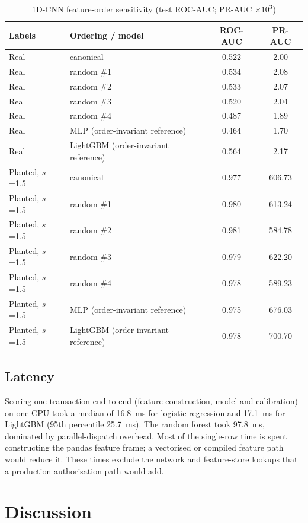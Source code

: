 \documentclass[conference]{IEEEtran}
\begin{document}
\begin{table}[t]
\centering
\caption{1D-CNN feature-order sensitivity (test ROC-AUC; PR-AUC $\times10^3$)}\label{tab:cnn}
\footnotesize
\setlength{\tabcolsep}{3pt}
\begin{tabular}{@{}llcc@{}}
\toprule
Labels & Ordering / model & ROC-AUC & PR-AUC \\
\midrule
Real & canonical & 0.522 & 2.00 \\
Real & random \#1 & 0.534 & 2.08 \\
Real & random \#2 & 0.533 & 2.07 \\
Real & random \#3 & 0.520 & 2.04 \\
Real & random \#4 & 0.487 & 1.89 \\
Real & MLP (order-invariant reference) & 0.464 & 1.70 \\
Real & LightGBM (order-invariant reference) & 0.564 & 2.17 \\
Planted, $s$=1.5 & canonical & 0.977 & 606.73 \\
Planted, $s$=1.5 & random \#1 & 0.980 & 613.24 \\
Planted, $s$=1.5 & random \#2 & 0.981 & 584.78 \\
Planted, $s$=1.5 & random \#3 & 0.979 & 622.20 \\
Planted, $s$=1.5 & random \#4 & 0.978 & 589.23 \\
Planted, $s$=1.5 & MLP (order-invariant reference) & 0.975 & 676.03 \\
Planted, $s$=1.5 & LightGBM (order-invariant reference) & 0.978 & 700.70 \\
\bottomrule
\end{tabular}
\end{table}

\subsection{Latency}
Scoring one transaction end to end (feature construction, model and calibration) on one CPU took a median of 16.8~ms for logistic regression and 17.1~ms for LightGBM (95th percentile 25.7~ms). The random forest took 97.8~ms, dominated by parallel-dispatch overhead. Most of the single-row time is spent constructing the pandas feature frame; a vectorised or compiled feature path would reduce it. These times exclude the network and feature-store lookups that a production authorisation path would add.

\section{Discussion}
\end{document}

